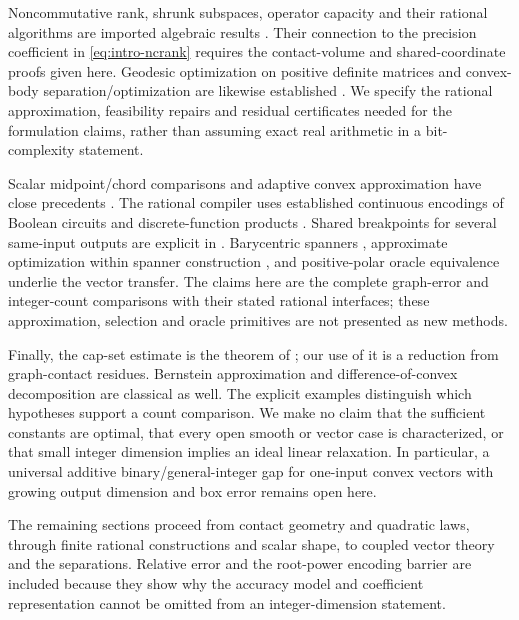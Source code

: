 Noncommutative rank, shrunk subspaces, operator capacity and their rational
algorithms are imported algebraic results \citep{ggow2020,iqs2018}.
Their connection to the precision coefficient in \eqref{eq:intro-ncrank}
requires the contact-volume and shared-coordinate proofs given here.
Geodesic optimization on positive definite matrices and convex-body
separation/optimization are likewise established
\citep{sra2013,zhang2016,gls1981}. We specify the rational approximation,
feasibility repairs and residual certificates needed for the formulation
claims, rather than assuming exact real arithmetic in a bit-complexity
statement.

Scalar midpoint/chord comparisons and adaptive convex approximation have
close precedents \citep{simchowitz2018,codsi2021}. The rational compiler
uses established continuous encodings of Boolean circuits
\citep{avis2019} and discrete-function products \citep{adams2012}.
Shared breakpoints for several same-input outputs are explicit in
\citet{lyu2026}. Barycentric spanners \citep{awerbuch2004}, approximate
optimization within spanner construction \citep{plevrakis2020}, and
positive-polar oracle equivalence \citep{gls1981} underlie the vector
transfer. The claims here are the complete graph-error and integer-count
comparisons with their stated rational interfaces; these approximation,
selection and oracle primitives are not presented as new methods.

Finally, the cap-set estimate is the theorem of \citet{ellenberg2017};
our use of it is a reduction from graph-contact residues. Bernstein
approximation and difference-of-convex decomposition are classical as
well. The explicit examples distinguish which hypotheses support a
count comparison. We make no claim that the sufficient constants are
optimal, that every open smooth or vector case is characterized, or that
small integer dimension implies an ideal linear relaxation. In particular,
a universal additive binary/general-integer gap for one-input convex
vectors with growing output dimension and box error remains open here.

The remaining sections proceed from contact geometry and quadratic laws,
through finite rational constructions and scalar shape, to coupled vector
theory and the separations. Relative error and the root-power encoding
barrier are included because they show why the accuracy model and coefficient
representation cannot be omitted from an integer-dimension statement.
